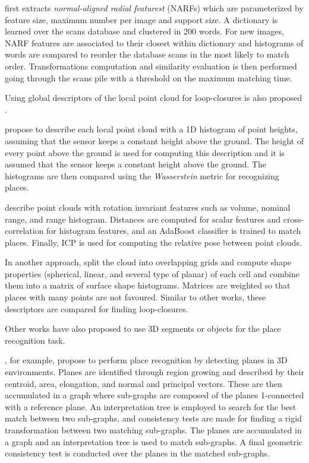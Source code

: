 \citet{steder2011place} first extracts \textit{normal-aligned radial featurest} (NARFs) which are parameterized by feature size, maximum number per image and support size. A dictionary is learned over the scans database and clustered in 200 words. For new images, NARF features are associated to their closest within dictionary and histograms of words are compared to reorder the database scans in the most likely to match order. Transformations computation and similarity evaluation is then performed going through the scans pile with a threshold on the maximum matching time.

Using global descriptors of the local point cloud for loop-closures is also proposed \cite{rohling2015fast,granstrom2011learning,magnusson2009automatic}.

\citet{rohling2015fast} propose to describe each local point cloud with a 1D histogram of point heights, assuming that the sensor keeps a constant height above the ground.  The height of every point above the ground is used for computing this description and it is assumed that the sensor keeps a constant height above the ground.  The histograms are then compared using the \textit{Wasserstein} metric for recognizing places.

\citet{granstrom2011learning} describe point clouds with rotation invariant features such as volume, nominal range, and range histogram.  Distances are computed for scalar features and cross-correlation for histogram features, and an AdaBoost classifier is trained to match places.  Finally, ICP is used for computing the relative pose between point clouds.

In another approach, \citet{magnusson2009automatic} split the cloud into overlapping grids and compute shape properties (spherical, linear, and several type of planar) of each cell and combine them into a matrix of surface shape histograms.  Matrices are weighted so that places with many points are not favoured.  Similar to other works, these descriptors are compared for finding loop-closures.


Other works have also proposed to use 3D segments or objects for the place recognition task.

\citet{fernandez2013fast}, for example, propose to perform place recognition by detecting planes in 3D environments.  Planes are identified through region growing and described by their centroid, area, elongation, and normal and principal vectors.  These are then accumulated in a graph where sub-graphs are composed of the planes 1-connected with a reference plane.  An interpretation tree is employed to search for the best match between two sub-graphs, and consistency tests are made for finding a rigid transformation between two matching sub-graphs.  The planes are accumulated in a graph and an interpretation tree is used to match sub-graphs.  A final geometric consistency test is conducted over the planes in the matched sub-graphs.

